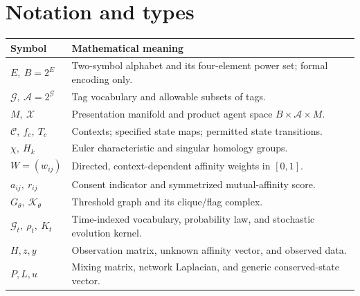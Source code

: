 \documentclass[11pt,a4paper]{article}
\numberwithin{equation}{section}
\theoremstyle{remark}
\newcommand{\G}{\mathcal{G}}
\newcommand{\A}{\mathcal{A}}
\newcommand{\X}{\mathcal{X}}
\newcommand{\C}{\mathcal{C}}
\newcommand{\K}{\mathcal{K}}
\newcommand{\1}{\mathbf{1}}
\begin{document}
\appendix
\section{Notation and types}
\begin{center}
\renewcommand{\arraystretch}{1.12}
\begin{tabular}{@{}p{}p{}@{}}
\toprule
Symbol & Mathematical meaning\\
\midrule
$E,\ B=2^E$ & Two-symbol alphabet and its four-element power set; formal encoding only.\\
$\G,\ \A=2^\G$ & Tag vocabulary and allowable subsets of tags.\\
$M,\ \X$ & Presentation manifold and product agent space $B\times\A\times M$.\\
$\C,\ f_c,\ T_c$ & Contexts; specified state maps; permitted state transitions.\\
$\chi,\ H_k$ & Euler characteristic and singular homology groups.\\
$W=(w_{ij})$ & Directed, context-dependent affinity weights in $[0,1]$.\\
$a_{ij},\ r_{ij}$ & Consent indicator and symmetrized mutual-affinity score.\\
$G_\theta,\ \K_\theta$ & Threshold graph and its clique/flag complex.\\
$\G_t,\ \rho_t,\ K_t$ & Time-indexed vocabulary, probability law, and stochastic evolution kernel.\\
$H,z,y$ & Observation matrix, unknown affinity vector, and observed data.\\
$P,L,u$ & Mixing matrix, network Laplacian, and generic conserved-state vector.\\
\bottomrule
\end{tabular}
\end{center}
\end{document}
